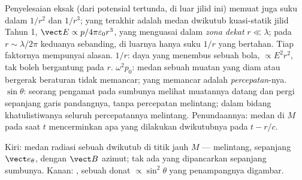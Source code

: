 \begin{remark}\label{rem:b2:dipole-radiation:reading}
Penyelesaian eksak  (dari potensial
tertunda, di luar jilid ini) memuat juga suku dalam $1/r^2$ dan
$1/r^3$; yang terakhir adalah medan dwikutub kuasi-statik jilid Tahun 1,
$\vect E \propto p/4\pi\varepsilon_0r^3$, yang menguasai dalam \emph{zona
dekat} $r \ll \lambda$; pada $r \sim \lambda/2\pi$ keduanya sebanding, di luarnya
hanya suku $1/r$ yang bertahan. Tiap faktornya mempunyai alasan. $1/r$:
daya yang menembus sebuah bola, $\propto E^2r^2$, tak boleh bergantung pada $r$. $\omega^2p_0$:
medan sebuah muatan yang diam atau bergerak beraturan tidak memancar; yang
memancar adalah \emph{percepatan}-nya. $\sin\theta$: seorang pengamat pada
sumbunya melihat muatannya datang dan pergi sepanjang garis pandangnya, tanpa
percepatan melintang; dalam bidang khatulistiwanya seluruh
percepatannya melintang. Penundaannya: medan di $M$ pada saat $t$
mencerminkan apa yang dilakukan dwikutubnya pada $t - r/c$.
\end{remark}

\begin{omfigure}

{\small Kiri: medan radiasi sebuah dwikutub di titik jauh $M$ ---
melintang, sepanjang $\vect e_\theta$, dengan $\vect B$ azimut; tak ada yang
dipancarkan sepanjang sumbunya. Kanan: , sebuah donat
$\propto\sin^2\theta$ yang penampangnya digambar.}
\end{omfigure}

